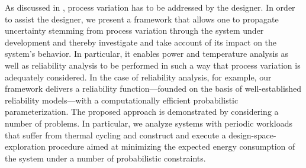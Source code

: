 As discussed in , process variation has to be addressed
by the designer. In order to assist the designer, we present a framework that
allows one to propagate uncertainty stemming from process variation through the
system under development and thereby investigate and take account of its impact
on the system's behavior. In particular, it enables power and temperature
analysis as well as reliability analysis to be performed in such a way that
process variation is adequately considered. In the case of reliability analysis,
for example, our framework delivers a reliability function---founded on the
basis of well-established reliability models---with a computationally efficient
probabilistic parameterization. The proposed approach is demonstrated by
considering a number of problems. In particular, we analyze systems with
periodic workloads that suffer from thermal cycling and construct and execute a
design-space-exploration procedure aimed at minimizing the expected energy
consumption of the system under a number of probabilistic constraints.
